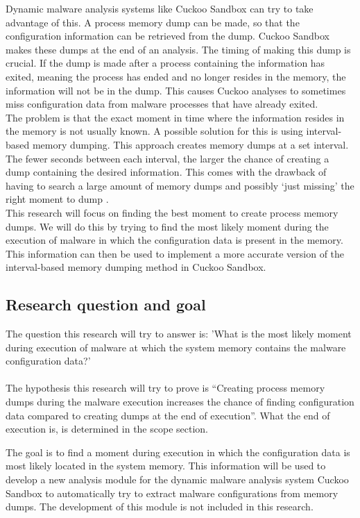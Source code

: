 \documentclass[conference]{IEEEtran}
\begin{document}
Dynamic malware analysis systems like Cuckoo Sandbox \cite{cuckoo} can try to take advantage of this. A process memory dump can be made, so that the configuration information can be retrieved from the dump. Cuckoo Sandbox makes these dumps at the end of an analysis. The timing of making this dump is crucial. If the dump is made after a process containing the information has exited, meaning the process has ended and no longer resides in the memory, the information will not be in the dump. This causes Cuckoo analyses to sometimes miss configuration data from malware processes that have already exited.\\

The problem is that the exact moment in time where the information resides in the memory is not usually known. A possible solution for this is using interval-based memory dumping. This approach creates memory dumps at a set interval. The fewer seconds between each interval, the larger the chance of creating a dump containing the desired information. This comes with the drawback of having to search a large amount of memory dumps and possibly ‘just missing’ the right moment to dump \cite{teller-memory}.\\

This research will focus on finding the best moment to create process memory dumps. We will do this by trying to find the most likely moment during the execution of malware in which the configuration data is present in the memory. This information can then be used to implement a more accurate version of the interval-based memory dumping method in Cuckoo Sandbox.\\


\subsection{Research question and goal}
The question this research will try to answer is: 'What is the most likely moment during execution of malware at which the system memory contains the malware configuration data?'\\
\\The hypothesis this research will try to prove is “Creating process memory dumps during the malware execution increases the chance of finding configuration data compared to creating dumps at the end of execution”. What the end of execution is, is determined in the scope section.

The goal is to find a moment during execution in which the configuration data is most likely located in the system memory. This information will be used to develop a new analysis module for the dynamic malware analysis system Cuckoo Sandbox to automatically try to extract malware configurations from memory dumps. The development of this module is not included in this research.
\end{document}

